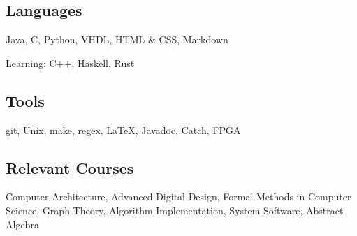 \documentclass[18pt]{article}
\providecommand{\tightlist}{
    \setlength{\itemsep}{0pt}\setlength{\parskip}{0pt}
}
\begin{document}
  \subsection*{Languages}\label{languages}
  Java,
  C,
  Python,
  VHDL,
  HTML \& CSS,
  Markdown
  
  Learning: C++, Haskell, Rust
  
  \subsection*{Tools}\label{tools}
  git,
  Unix,
  make,
  regex,
  \LaTeX,
  Javadoc,
  Catch,
  FPGA
  
  \subsection*{Relevant Courses}\label{relevant-courses}
      Computer Architecture,
      Advanced Digital Design,
      Formal Methods in Computer Science,
      Graph Theory,
      Algorithm Implementation,
      System Software,
      Abstract Algebra
    
\end{document}
